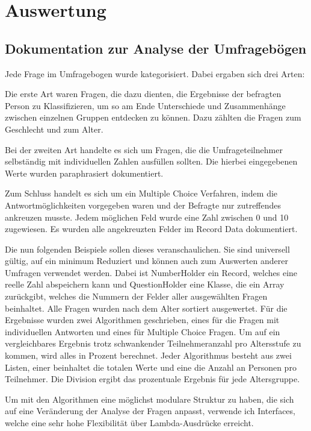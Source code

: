 \section{Auswertung}

\subsection{Dokumentation zur Analyse der Umfragebögen}

Jede Frage im Umfragebogen wurde kategorisiert. Dabei ergaben sich drei Arten: 

Die erste Art waren Fragen, die dazu dienten, die Ergebnisse der befragten Person zu Klassifizieren, um so am Ende Unterschiede und Zusammenhänge zwischen einzelnen Gruppen entdecken zu können. Dazu zählten die Fragen zum Geschlecht und zum Alter. 

Bei der zweiten Art handelte es sich um Fragen, die die Umfrageteilnehmer selbständig mit individuellen Zahlen ausfüllen sollten. Die hierbei eingegebenen Werte wurden paraphrasiert dokumentiert. 

Zum Schluss handelt es sich um ein Multiple Choice Verfahren, indem die Antwortmöglichkeiten vorgegeben waren und der Befragte nur zutreffendes ankreuzen musste. Jedem möglichen Feld wurde eine Zahl zwischen 0 und 10 zugewiesen. Es wurden alle angekreuzten Felder im Record Data dokumentiert.

Die nun folgenden Beispiele sollen dieses veranschaulichen. Sie sind universell gültig, auf ein minimum Reduziert und können auch zum Auswerten anderer Umfragen verwendet werden. Dabei ist NumberHolder ein Record, welches eine reelle Zahl abspeichern kann und QuestionHolder eine Klasse, die ein Array zurückgibt, welches die Nummern der Felder aller ausgewählten Fragen beinhaltet. Alle Fragen wurden nach dem Alter sortiert ausgewertet. Für die Ergebnisse wurden zwei Algorithmen geschrieben, eines für die Fragen mit individuellen Antworten und eines für Multiple Choice Fragen. Um auf ein vergleichbares Ergebnis trotz schwankender Teilnehmeranzahl pro Altersstufe zu kommen, wird alles in Prozent berechnet. Jeder Algorithmus besteht aus zwei Listen, einer beinhaltet die totalen Werte und eine die Anzahl an Personen pro Teilnehmer. Die Division ergibt das prozentuale Ergebnis für jede Altersgruppe.

Um mit den Algorithmen eine möglichst modulare Struktur zu haben, die sich auf eine Veränderung der Analyse der Fragen anpasst, verwende ich Interfaces, welche eine sehr hohe Flexibilität über Lambda-Ausdrücke erreicht.

